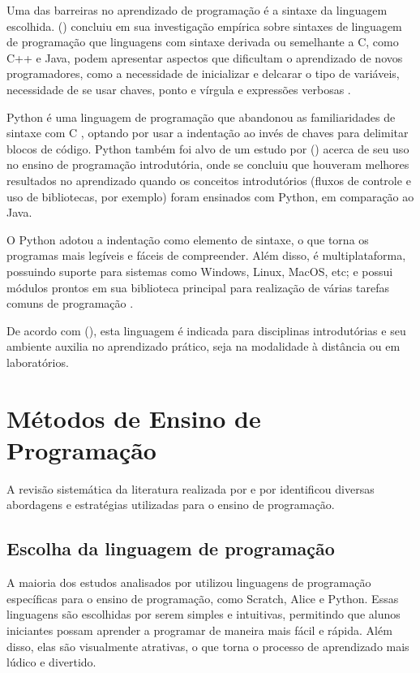 Uma das barreiras no aprendizado de programação é a sintaxe da linguagem escolhida. \citeauthor{stefik2013} (\citeyear{stefik2013}) concluiu em sua investigação empírica sobre sintaxes de linguagem de programação que linguagens com sintaxe derivada ou semelhante a C, como C++ e Java, podem apresentar aspectos que dificultam o aprendizado de novos programadores, como a necessidade de inicializar e delcarar o tipo de variáveis, necessidade de se usar chaves, ponto e vírgula e expressões verbosas \cite{mannila2006}.

Python é uma linguagem de programação que abandonou as familiaridades de sintaxe com C \cite{stefik2013}, optando por usar a indentação ao invés de chaves para delimitar blocos de código. Python também foi alvo de um estudo por \citeauthor{jayal2015} (\citeyear{jayal2015}) acerca de seu uso no ensino de programação introdutória, onde se concluiu que houveram melhores resultados no aprendizado quando os conceitos introdutórios (fluxos de controle e uso de bibliotecas, por exemplo) foram ensinados com Python, em comparação ao Java.

O Python adotou a indentação como elemento de sintaxe, o que torna os programas mais legíveis e fáceis de compreender. Além disso, é multiplataforma, possuindo suporte para sistemas como Windows, Linux, MacOS, etc; e possui módulos prontos em sua biblioteca principal para realização de várias tarefas comuns de programação \cite{moraispires2002}.

De acordo com \citeauthor{fangohr2004} (\citeyear{fangohr2004}), esta linguagem é indicada para disciplinas introdutórias e seu ambiente auxilia no aprendizado prático, seja na modalidade à distância ou em laboratórios.

\section{Métodos de Ensino de Programação}

A revisão sistemática da literatura realizada por \cite{Silva2014} e por \cite{Silva2018} identificou diversas abordagens e estratégias utilizadas para o ensino de programação.

\subsection{Escolha da linguagem de programação}

A maioria dos estudos analisados por \cite{Silva2014} utilizou linguagens de programação específicas para o ensino de programação, como Scratch, Alice e Python. Essas linguagens são escolhidas por serem simples e intuitivas, permitindo que alunos iniciantes possam aprender a programar de maneira mais fácil e rápida. Além disso, elas são visualmente atrativas, o que torna o processo de aprendizado mais lúdico e divertido.

